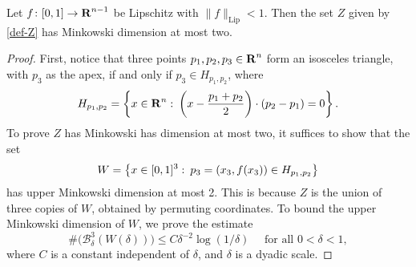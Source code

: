 \begin{lemma}
	Let $f\colon [0,1] \to \operatorname{\mathbf{R}}^{n-1}$ be Lipschitz with $\| f \|_{\text{Lip}} < 1$. Then the set $Z$ given by \eqref{def-Z} has Minkowski dimension at most two.
\end{lemma}
\begin{proof}
	First, notice that three points $p_1,p_2,p_3 \in \operatorname{\mathbf{R}}^n$ form an isosceles triangle, with $p_3$ as the apex, if and only if $p_3 \in H_{p_1,p_2}$, where
	\begin{equation} \label{def-H}  H_{p_1,p_2} = \left\{ x \in \operatorname{\mathbf{R}}^n \operatorname{\colon} \left( x - \frac{p_1 + p_2}{2} \right) \cdot (p_2 - p_1) = 0 \right\}. \end{equation} 
	To prove $Z$ has Minkowski has dimension at most two, it suffices to show that the set
	\[ W = \left\{ x \in [0,1]^3 \operatorname{\colon} p_3 = (x_3,f(x_3)) \in H_{p_1, p_2} \right\} \]
	has upper Minkowski dimension at most 2. This is because $Z$ is the union of three copies of $W$, obtained by permuting coordinates. To bound the upper Minkowski dimension of $W$, we prove the estimate
	\begin{equation}\label{boundOnWCoveringNumber}  \# \bigl(\mathcal B_{\delta}^3(W(\delta)) \bigr) \leq C \delta^{-2} \log(1/\delta) \quad \text{ for all } 0 < \delta < 1,  
	\end{equation}  
	where $C$ is a constant independent of $\delta$, and $\delta$ is a dyadic scale.


\end{proof}

